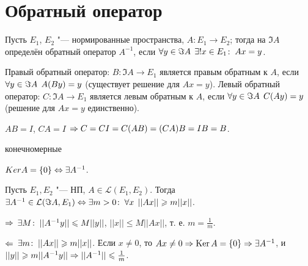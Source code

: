 \documentclass[main]{subfiles}
\begin{document}
\section{Обратный оператор}

\begin{definition}
  Пусть \( E_1 \), \( E_2 \) "--- нормированные пространства,
  \( A : E_1 \to E_2 \); тогда на \( \Im A \) определён обратный
  оператор \( A^{-1} \), если \( \forall {y \in \Im A} \; \,
  \exists! x \in E_1 \colon \: Ax = y \).
\end{definition}

Правый обратный оператор: \( B : \Im A \to E_1 \) является
правым обратным к \( A \), если \( \forall {y \in \Im A} \; \,
A(By) = y \) (существует решение для \( Ax = y \)).
Левый обратный оператор: \( C : \Im A \to E_1 \) является
левым обратным к \( A \), если \( \forall {y \in \Im A} \; \,
C(Ay) = y \) (решение для \( Ax = y \) единственно).

\( AB = I \), \( CA = I \) \( \Rightarrow
C = C I = C (AB) = (CA) B = I B = B \).

конечномерные

\( Ker A = \{ 0 \} \Leftrightarrow \exists A^{-1} \).

\begin{theorem}
  Пусть \( E_1, E_2 \) "--- НП, \( A \in \mathcal{L}(E_1, E_2) \).
  Тогда \( \exists A^{-1} \in \mathcal{L}(\Im A, E_1) \Leftrightarrow
  \exists m > 0 \colon \: \forall {x} \; \, ||Ax|| \geqslant m ||x|| \).
\end{theorem}
\begin{itemproof}
\item [$\Rightarrow$] \( \exists M \colon \: ||A^{-1} y|| \leqslant M||y|| \),
  \( ||x|| \le M ||Ax|| \), т. е. \( m = \frac{1}{m} \).
\item[$\Leftarrow$] \( \exists m \colon \: ||Ax|| \geqslant m ||x|| \).
  Если \( x \ne 0 \), то \( Ax \ne 0 \Rightarrow \operatorname{Ker} A = \{ 0 \} \Rightarrow
  \exists A^{-1} \), и \( ||y|| \geqslant m ||A^{-1} y|| \Rightarrow
  ||A^{-1}|| \leqslant \frac{1}{m} \).
\end{itemproof}
\end{document}
